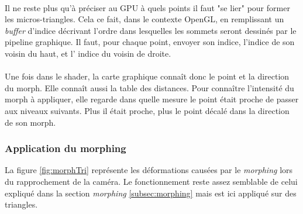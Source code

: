 	\paragraph{}
	Il ne reste plus qu'à préciser au GPU à quels points il faut "se lier" pour former les micros-triangles. Cela ce fait, dans le contexte OpenGL, en remplissant un \textit{buffer} d'indice décrivant l'ordre dans lesquelles les sommets seront dessinés par le pipeline graphique. Il faut, pour chaque point, envoyer son indice, l'indice de son voisin du haut, et l' indice du voisin de droite.%
	\paragraph{}
	Une fois dans le shader, la carte graphique connaît donc le point et la direction du morph. Elle connaît aussi la table des distances. Pour connaître l'intensité du morph à appliquer, elle regarde dans quelle mesure le point était proche de passer aux niveaux suivants. Plus il était proche, plus le point décalé dans la direction de son morph.
	
	
  \subsubsection{Application du morphing}
  La figure \ref{fig:morphTri} représente les déformations causées par le \textit{morphing} lors du rapprochement de la caméra. Le fonctionnement reste assez semblable de celui expliqué dans la section \textit{morphing} \ref{subsec:morphing} mais est ici appliqué sur des triangles.
  	
